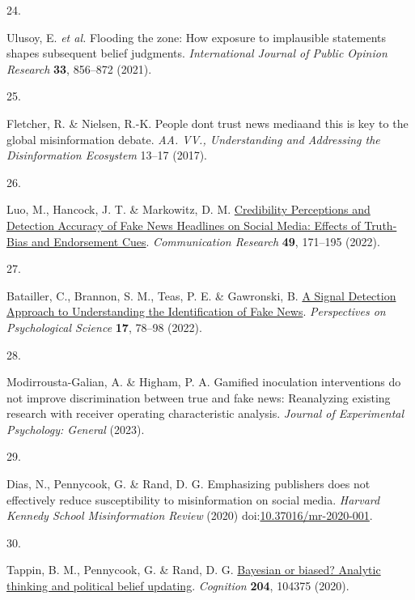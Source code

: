 \documentclass[
  doc,floatsintext]{apa6}
\newlength{\cslhangindent}
\newlength{\csllabelwidth}
\newenvironment{CSLReferences}[2] %
 {\begin{list}{}{%
  \setlength{\itemindent}{0pt}
  \setlength{\leftmargin}{0pt}
  \setlength{\parsep}{0pt}
  \ifodd #1
   \setlength{\leftmargin}{\cslhangindent}
   \setlength{\itemindent}{-1\cslhangindent}
  \fi
  \setlength{\itemsep}{#2\baselineskip}}}
 {\end{list}}
\newcommand{\CSLLeftMargin}[1]{\parbox[t]{\csllabelwidth}{\strut#1\strut}}
\newcommand{\CSLRightInline}[1]{\parbox[t]{\linewidth - \csllabelwidth}{\strut#1\strut}}
\begin{document}
\begin{CSLReferences}{0}{0}
\CSLLeftMargin{24. }%
\CSLRightInline{Ulusoy, E. \emph{et al.} Flooding the zone: How exposure to implausible statements shapes subsequent belief judgments. \emph{International Journal of Public Opinion Research} \textbf{33}, 856--872 (2021).}

\CSLLeftMargin{25. }%
\CSLRightInline{Fletcher, R. \& Nielsen, R.-K. People dont trust news media{\textendash}and this is key to the global misinformation debate. \emph{AA. VV., Understanding and Addressing the Disinformation Ecosystem} 13--17 (2017).}

\CSLLeftMargin{26. }%
\CSLRightInline{*Luo, M., Hancock, J. T. \& Markowitz, D. M. \href{https://doi.org/10.1177/0093650220921321}{Credibility Perceptions and Detection Accuracy of Fake News Headlines on Social Media: Effects of Truth-Bias and Endorsement Cues}. \emph{Communication Research} \textbf{49}, 171--195 (2022).}

\CSLLeftMargin{27. }%
\CSLRightInline{Batailler, C., Brannon, S. M., Teas, P. E. \& Gawronski, B. \href{https://doi.org/10.1177/1745691620986135}{A Signal Detection Approach to Understanding the Identification of Fake News}. \emph{Perspectives on Psychological Science} \textbf{17}, 78--98 (2022).}

\CSLLeftMargin{28. }%
\CSLRightInline{Modirrousta-Galian, A. \& Higham, P. A. Gamified inoculation interventions do not improve discrimination between true and fake news: Reanalyzing existing research with receiver operating characteristic analysis. \emph{Journal of Experimental Psychology: General} (2023).}

\CSLLeftMargin{29. }%
\CSLRightInline{*Dias, N., Pennycook, G. \& Rand, D. G. Emphasizing publishers does not effectively reduce susceptibility to misinformation on social media. \emph{Harvard Kennedy School Misinformation Review} (2020) doi:\href{https://doi.org/10.37016/mr-2020-001}{10.37016/mr-2020-001}.}

\CSLLeftMargin{30. }%
\CSLRightInline{Tappin, B. M., Pennycook, G. \& Rand, D. G. \href{https://doi.org/10.1016/j.cognition.2020.104375}{Bayesian or biased? Analytic thinking and political belief updating}. \emph{Cognition} \textbf{204}, 104375 (2020).}


\end{CSLReferences}
\end{document}
